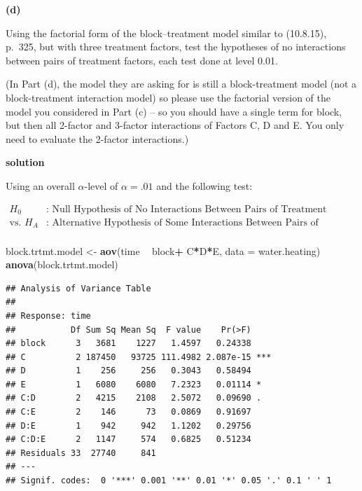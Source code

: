 \documentclass[12pt,]{article}
\newenvironment{Shaded}{\begin{snugshade}}{\end{snugshade}}
\newcommand{\KeywordTok}[1]{\textcolor[rgb]{0.13,0.29,0.53}{\textbf{#1}}}
\newcommand{\DataTypeTok}[1]{\textcolor[rgb]{0.13,0.29,0.53}{#1}}
\newcommand{\StringTok}[1]{\textcolor[rgb]{0.31,0.60,0.02}{#1}}
\newcommand{\OperatorTok}[1]{\textcolor[rgb]{0.81,0.36,0.00}{\textbf{#1}}}
\newcommand{\NormalTok}[1]{#1}
\begin{document}
\textbf{(d)}

Using the factorial form of the block--treatment model similar to
(10.8.15), p.~325, but with three treatment factors, test the hypotheses
of no interactions between pairs of treatment factors, each test done at
level 0.01.

(In Part (d), the model they are asking for is still a block-treatment
model (not a block-treatment interaction model) so please use the
factorial version of the model you considered in Part (c) -- so you
should have a single term for block, but then all 2-factor and 3-factor
interactions of Factors C, D and E. You only need to evaluate the
2-factor interactions.)

\textbf{solution}

Using an overall \(\alpha\)-level of \(\alpha=.01\) and the following
test:

\[
\begin{aligned}
H_0& : \text{ Null Hypothesis of No Interactions Between Pairs of Treatment Factors}\\
\text{vs. } H_A& : \text{ Alternative Hypothesis of Some Interactions Between Pairs of Treatment Factors}\\
\end{aligned}
\]

\begin{Shaded}
\begin{Highlighting}[]
\NormalTok{block.trtmt.model <-}\StringTok{ }\KeywordTok{aov}\NormalTok{(time }\OperatorTok{~}\StringTok{ }\NormalTok{block}\OperatorTok{+}\StringTok{ }\NormalTok{C}\OperatorTok{*}\NormalTok{D}\OperatorTok{*}\NormalTok{E, }\DataTypeTok{data =}\NormalTok{ water.heating)}
\KeywordTok{anova}\NormalTok{(block.trtmt.model)}
\end{Highlighting}
\end{Shaded}

\begin{verbatim}
## Analysis of Variance Table
## 
## Response: time
##           Df Sum Sq Mean Sq  F value    Pr(>F)    
## block      3   3681    1227   1.4597   0.24338    
## C          2 187450   93725 111.4982 2.087e-15 ***
## D          1    256     256   0.3043   0.58494    
## E          1   6080    6080   7.2323   0.01114 *  
## C:D        2   4215    2108   2.5072   0.09690 .  
## C:E        2    146      73   0.0869   0.91697    
## D:E        1    942     942   1.1202   0.29756    
## C:D:E      2   1147     574   0.6825   0.51234    
## Residuals 33  27740     841                       
## ---
## Signif. codes:  0 '***' 0.001 '**' 0.01 '*' 0.05 '.' 0.1 ' ' 1
\end{verbatim}
\end{document}
